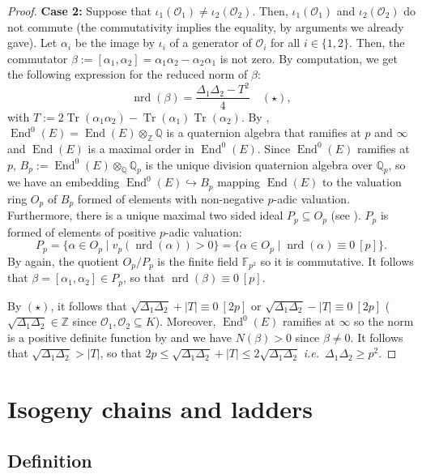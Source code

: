 \documentclass[a4paper,10pt,notitlepage]{report}
\theoremstyle{definition}
\theoremstyle{plain}
\theoremstyle{definition}
\newcommand{\ie}{\emph{i.e.}\ }
\newcommand{\Z}{\mathbb{Z}}
\newcommand{\Q}{\mathbb{Q}}
\newcommand{\F}{\mathbb{F}}
\newcommand{\mO}{\mathcal{O}}
\renewcommand{\(}{\left(}
\renewcommand{\)}{\right)}
\DeclareMathOperator{\End}{End}
\DeclareMathOperator{\Tr}{Tr}
\DeclareMathOperator{\nrd}{nrd}
\begin{document}
\begin{proof}
\textbf{Case 2:} Suppose that $\iota_1(\mO_1)\neq\iota_2(\mO_2)$. Then, $\iota_1(\mO_1)$ and $\iota_2(\mO_2)$ do not commute (the commutativity implies the equality, by arguments we already gave).  Let $\alpha_i$ be the image by $\iota_i$ of a generator of $\mO_i$ for all $i\in\{1,2\}$. Then, the commutator $\beta:=[\alpha_1,\alpha_2]=\alpha_1\alpha_2-\alpha_2\alpha_1$ is not zero.  By computation, we get the following expression for the reduced norm of $\beta$:
\[\nrd(\beta)=\frac{\Delta_1\Delta_2-T^2}{4}\quad (\star),\]
with $T:=2\Tr(\alpha_1\alpha_2)-\Tr(\alpha_1)\Tr(\alpha_2)$. By \cite[Theorem 42.1.19]{Voight}, $\End^0(E)=\End(E)\otimes_\Z \Q$ is a quaternion algebra that ramifies at $p$ and $\infty$ and $\End(E)$ is a maximal order in $\End^0(E)$. Since $\End^0(E)$ ramifies at $p$, $B_p:=\End^0(E)\otimes_\Q\Q_p$ is the unique division quaternion algebra over $\Q_p$, so we have an embedding $\End^0(E)\hookrightarrow B_p$ mapping $\End(E)$ to the valuation ring $O_p$ of $B_p$ formed of elements with non-negative $p$-adic valuation.  Furthermore, there is a unique maximal two sided ideal $P_p\subseteq O_p$ (see \cite[Theorem 13.3.11]{Voight}). $P_p$ is formed of elements of positive $p$-adic valuation:
\[P_p=\{\alpha\in O_p\mid v_p(\nrd(\alpha))>0\}=\{\alpha\in O_p\mid \nrd(\alpha)\equiv 0 \ [p]\}.\]
By \cite[Theorem 13.3.11.(b)]{Voight} again, the quotient $O_p/P_p$ is the finite field $\F_{p^2}$ so it is commutative. It follows that $\beta=[\alpha_1,\alpha_2]\in P_p$, so that $\nrd(\beta)\equiv 0 \ [p]$. 

By $(\star)$, it follows that $\sqrt{\Delta_1\Delta_2}+|T|\equiv 0 \ [2p]$ or $\sqrt{\Delta_1\Delta_2}-|T|\equiv 0 \ [2p]$ ($\sqrt{\Delta_1\Delta_2}\in\Z$ since $\mO_1,\mO_2\subseteq K$). Moreover, $\End^0(E)$ ramifies at $\infty$ so the norm is a positive definite function by \cite[Exercise 2.4]{Voight} and we have $N(\beta)>0$ since $\beta\neq 0$. It follows that $\sqrt{\Delta_1\Delta_2}>|T|$, so that $2p\leq\sqrt{\Delta_1\Delta_2}+|T|\leq 2\sqrt{\Delta_1\Delta_2}$ \ie  $\Delta_1\Delta_2\geq p^2$.
\end{proof}

\section{Isogeny chains and ladders}

\subsection{Definition}
\end{document}
